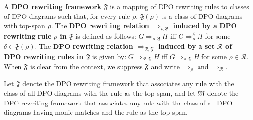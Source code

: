     
\begin{definition}
    A \textbf{DPO rewriting framework} $\mathfrak{F}$ is a mapping of DPO rewriting rules to classes of DPO diagrams such that, for every rule $\rho$, $\mathfrak{F}(\rho)$ is a class of DPO diagrams with top-span $\rho$.
    The \textbf{DPO rewriting relation $\Rightarrow_{\rho,\mathfrak{F}}$ induced by a DPO rewriting rule $\rho$ in $\mathfrak{F}$} is defined as follows: $G \Rightarrow_{\rho,\mathfrak{F}} H$ iff $G \Rightarrow_\rho^\delta H$ for some $\delta \in \mathfrak{F}(\rho)$. 
     The \textbf{DPO rewriting relation $\Rightarrow_{\mathcal{R},\mathfrak{F}}$ induced by a set $\mathcal{R}$ of DPO rewriting rules in $\mathfrak{F}$} is given by: $G \Rightarrow_{\mathcal{R},\mathfrak{F}} H$ iff $G \Rightarrow_{\rho,\mathfrak{F}} H$ for some $\rho \in \mathcal{R}$. When $\mathfrak{F}$ is clear from the context, we 
    suppress $\mathfrak{F}$ and 
    write $\Rightarrow_{\rho}$ and $\Rightarrow_{\mathcal{R}}$.
  \end{definition}
Let \(\mathfrak{F}\) denote the DPO rewriting framework that associates any rule with the class of all DPO diagrams with the rule as the top span, and let \(\mathfrak{M}\) denote the DPO rewriting framework that associates any rule with the class of all DPO diagrams having monic matches and the rule as the top span.  

